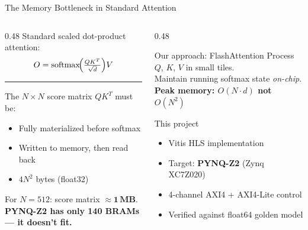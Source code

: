 \documentclass[aspectratio=169, 10pt]{beamer}
\newcommand{\good}[1]{{\color{GoodGrn}\textbf{#1}}}
\newcommand{\warn}[1]{{\color{WarnRed}\textbf{#1}}}
\newcommand{\hrulefull}{%
  \par\vspace{1pt}%
  {\color{SlateGry!40}\rule{\linewidth}{0.4pt}}%
  \par\vspace{2pt}%
}
\begin{document}
\begin{frame}{The Memory Bottleneck in Standard Attention}
  \begin{columns}[T]
    \begin{column}{0.48\textwidth}
      \vspace{0.1cm}
      Standard scaled dot-product attention:
      \[
        O = \operatorname{softmax}\!\Bigl(\tfrac{QK^T}{\sqrt{d}}\Bigr)V
      \]

      \vspace{0.05cm}
      \hrulefull

      The $N{\times}N$ score matrix $QK^T$ must be:
      \begin{itemize}\setlength\itemsep{3pt}
        \item Fully materialized before softmax
        \item Written to memory, then read back
        \item $4N^2$ bytes (float32)
      \end{itemize}

      \vspace{0.25cm}
      For $N{=}512$: score matrix $\approx \mathbf{1\,MB}$.\\[3pt]
      \warn{PYNQ-Z2 has only 140 BRAMs --- it doesn't fit.}
    \end{column}
    \begin{column}{0.48\textwidth}
      \vspace{0.1cm}
      \begin{block}{Our approach: FlashAttention}
        Process $Q$, $K$, $V$ in small tiles.\\
        Maintain running softmax state \emph{on-chip}.\\[4pt]
        \good{Peak memory: $O(N{\cdot}d)$ not $O(N^2)$}
      \end{block}

      \vspace{0.35cm}
      \begin{block}{This project}
        \begin{itemize}\setlength\itemsep{3pt}
          \item Vitis HLS implementation
          \item Target: \textbf{PYNQ-Z2} (Zynq XC7Z020)
          \item 4-channel AXI4 + AXI4-Lite control
          \item Verified against float64 golden model
        \end{itemize}
      \end{block}
    \end{column}
  \end{columns}
\end{frame}
\end{document}
